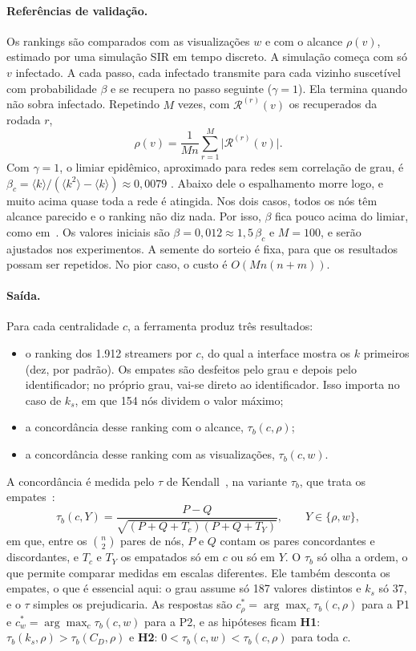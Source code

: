 \paragraph{Referências de validação.} Os rankings são comparados com as visualizações $w$ e com o
alcance $\rho(v)$, estimado por uma simulação SIR em tempo discreto. A simulação começa com só $v$
infectado. A cada passo, cada infectado transmite para cada vizinho suscetível com probabilidade
$\beta$ e se recupera no passo seguinte ($\gamma = 1$). Ela termina quando não sobra infectado.
Repetindo $M$ vezes, com $\mathcal{R}^{(r)}(v)$ os recuperados da rodada $r$,
\[
  \rho(v) = \frac{1}{Mn} \sum_{r=1}^{M} \bigl|\mathcal{R}^{(r)}(v)\bigr|.
\]
Com $\gamma = 1$, o limiar epidêmico, aproximado para redes sem correlação de grau, é
$\beta_c = \langle k \rangle / (\langle k^2 \rangle - \langle k \rangle) \approx 0{,}0079$
\cite{newman2002}. Abaixo dele o espalhamento morre logo, e muito acima quase toda a rede é atingida.
Nos dois casos, todos os nós têm alcance parecido e o ranking não diz nada. Por isso, $\beta$ fica
pouco acima do limiar, como em~\cite{kitsak2010}. Os valores iniciais são
$\beta = 0{,}012 \approx 1{,}5\,\beta_c$ e $M = 100$, e serão ajustados nos experimentos. A semente
do sorteio é fixa, para que os resultados possam ser repetidos. No pior caso, o custo é
$O(M n (n + m))$.

\paragraph{Saída.} Para cada centralidade $c$, a ferramenta produz três resultados:
\begin{itemize}
  \item o ranking dos 1.912 streamers por $c$, do qual a interface mostra os $k$ primeiros (dez, por
        padrão). Os empates
        são desfeitos pelo grau e depois pelo identificador; no próprio grau, vai-se direto ao
        identificador. Isso importa no caso de $k_s$, em que 154 nós dividem o valor máximo;
  \item a concordância desse ranking com o alcance, $\tau_b(c, \rho)$;
  \item a concordância desse ranking com as visualizações, $\tau_b(c, w)$.
\end{itemize}
A concordância é medida pelo $\tau$ de Kendall~\cite{kendall1938}, na variante $\tau_b$, que trata os
empates~\cite{kendall1945}:
\[
  \tau_b(c, Y) = \frac{P - Q}{\sqrt{(P + Q + T_c)(P + Q + T_Y)}}, \qquad Y \in \{\rho, w\},
\]
em que, entre os $\binom{n}{2}$ pares de nós, $P$ e $Q$ contam os pares concordantes e
discordantes, e $T_c$ e $T_Y$ os empatados só em $c$ ou só em $Y$. O $\tau_b$ só olha a ordem, o que
permite comparar medidas em escalas diferentes. Ele também desconta os empates, o que é essencial
aqui: o grau assume só 187 valores distintos e $k_s$ só 37, e o $\tau$ simples os prejudicaria. As respostas são
$c^*_\rho = \arg\max_c \tau_b(c, \rho)$ para a P1 e $c^*_w = \arg\max_c \tau_b(c, w)$ para a P2, e as
hipóteses ficam \textbf{H1}: $\tau_b(k_s, \rho) > \tau_b(C_D, \rho)$ e \textbf{H2}:
$0 < \tau_b(c, w) < \tau_b(c, \rho)$ para toda $c$.

